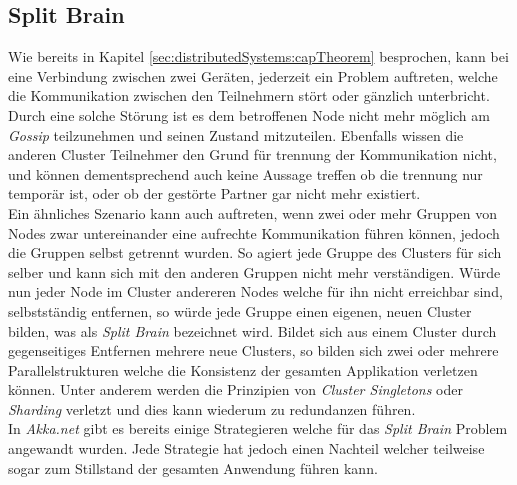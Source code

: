 \subsection{Split Brain} 
\label{subsec:implementation:splitBrain}
Wie bereits in Kapitel \ref{sec:distributedSystems:capTheorem} besprochen, kann bei eine Verbindung zwischen zwei Geräten, jederzeit ein Problem auftreten, welche die Kommunikation zwischen den Teilnehmern stört oder gänzlich unterbricht. Durch eine solche Störung ist es dem betroffenen Node nicht mehr möglich am \textit{Gossip} teilzunehmen und seinen Zustand mitzuteilen. Ebenfalls wissen die anderen Cluster Teilnehmer den Grund für trennung der Kommunikation nicht, und können dementsprechend auch keine Aussage treffen ob die trennung nur temporär ist, oder ob der gestörte Partner gar nicht mehr existiert. \\
Ein ähnliches Szenario kann auch auftreten, wenn zwei oder mehr Gruppen von Nodes zwar untereinander eine aufrechte Kommunikation führen können, jedoch die Gruppen selbst getrennt wurden. So agiert jede Gruppe des Clusters für sich selber und kann sich  mit den anderen Gruppen nicht mehr verständigen. Würde nun jeder Node im Cluster andereren Nodes welche für ihn nicht erreichbar sind, selbstständig entfernen, so würde jede Gruppe einen eigenen, neuen Cluster bilden, was als \textit{Split Brain} bezeichnet wird. Bildet sich aus einem Cluster durch gegenseitiges Entfernen mehrere neue Clusters, so bilden sich zwei oder mehrere Parallelstrukturen welche die Konsistenz der gesamten Applikation verletzen können. Unter anderem werden die Prinzipien von \textit{Cluster Singletons} oder \textit{Sharding} verletzt und dies kann wiederum zu redundanzen führen. \\
In \textit{Akka.net} gibt es bereits einige Strategieren welche für das \textit{Split Brain} Problem angewandt wurden. Jede Strategie hat jedoch einen Nachteil welcher teilweise sogar zum Stillstand der gesamten Anwendung führen kann. 

